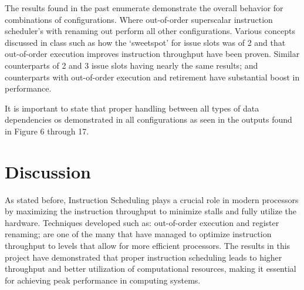 \documentclass{article}
\begin{document}
The results found in the past enumerate demonstrate the overall behavior for combinations of configurations. Where out-of-order superscalar instruction scheduler's with renaming out perform all other configurations. Various concepts discussed in class such as how the `sweetspot' for issue slots was of 2 and that out-of-order execution improves instruction throughput have been proven. Similar counterparts of 2 and 3 issue slots having nearly the same results; and counterparts with out-of-order execution and retirement have substantial boost in performance. 

It is important to state that proper handling between all types of data dependencies os demonstrated in all configurations as seen in the outputs found in Figure 6 through 17. 

\section{Discussion}
As stated before, Instruction Scheduling plays a crucial role in modern processors by maximizing the instruction throughput to minimize stalls and fully utilize the hardware. Techniques developed such as: out-of-order execution and register renaming; are one of the many that have managed to optimize instruction throughput to levels that allow for more efficient processors. The results in this project have demonstrated that proper instruction scheduling leads to higher throughput and better utilization of computational resources, making it essential for achieving peak performance in computing systems. 
\end{document}
